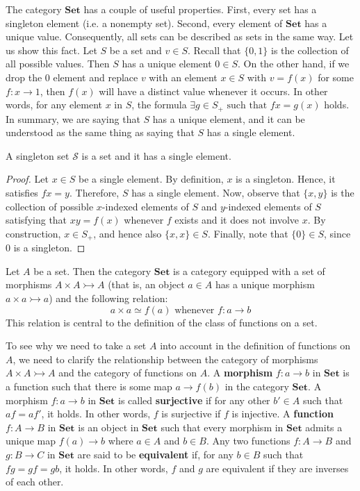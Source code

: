 \documentclass[a4paper,reqno,oneside]{article}
\begin{document}
The category $\mathbf{Set}$ has a couple of useful properties. First, every set has a singleton element (i.e. a nonempty set). Second, every element of $\mathbf{Set}$ has a unique value. Consequently, all sets can be described as sets in the same way. Let us show this fact. Let $S$ be a set and $v \in S$. Recall that $\{0,1\}$ is the collection of all possible values. Then $S$ has a unique element $0 \in S$. On the other hand, if we drop the $0$ element and replace $v$ with an element $x \in S$ with $v=f(x)$ for some $f : x \to 1$, then $f(x)$ will have a distinct value whenever it occurs. In other words, for any element $x$ in $S$, the formula $\exists g \in S_{+} \text{ such that } fx = g(x)$ holds. In summary, we are saying that $S$ has a unique element, and it can be understood as the same thing as saying that $S$ has a single element.

\begin{proposition}
    A singleton set $\mathcal{S}$ is a set and it has a single element.
\end{proposition}

\begin{proof}
    Let $x \in S$ be a single element. By definition, $x$ is a singleton. Hence, it satisfies $fx = y$. Therefore, $S$ has a single element. Now, observe that $\{x,y\}$ is the collection of possible $x$-indexed elements of $S$ and $y$-indexed elements of $S$ satisfying that $xy = f(x)$ whenever $f$ exists and it does not involve $x$. By construction, $x \in S_{+}$, and hence also $\{x,x\} \in S$. Finally, note that $\{0\} \in S$, since $0$ is a singleton.
\end{proof}

Let $A$ be a set. Then the category $\mathbf{Set}$ is a category equipped with a set of morphisms $A \times A \rightarrowtail A$ (that is, an object $a \in A$ has a unique morphism $a \times a \rightarrowtail a$) and the following relation:
\begin{equation}\label{eq:relation a set}
    a \times a \simeq f(a) \text{ whenever } f : a \to b
\end{equation}
This relation is central to the definition of the class of functions on a set.

To see why we need to take a set $A$ into account in the definition of functions on $A$, we need to clarify the relationship between the category of morphisms $A \times A \rightarrowtail A$ and the category of functions on $A$. A \textbf{morphism} $f : a \to b$ in $\mathbf{Set}$ is a function such that there is some map $a \to f(b)$ in the category $\mathbf{Set}$. A morphism $f : a \to b$ in $\mathbf{Set}$ is called \textbf{surjective} if for any other $b' \in A$ such that $af = af'$, it holds. In other words, $f$ is surjective if $f$ is injective. 
A \textbf{function} $f : A \to B$ in $\mathbf{Set}$ is an object in $\mathbf{Set}$ such that every morphism in $\mathbf{Set}$ admits a unique map $f(a) \to b$ where $a \in A$ and $b \in B$. Any two functions $f : A \to B$ and $g : B \to C$ in $\mathbf{Set}$ are said to be \textbf{equivalent} if, for any $b \in B$ such that $fg = gf = gb$, it holds. In other words, $f$ and $g$ are equivalent if they are inverses of each other.
\end{document}
